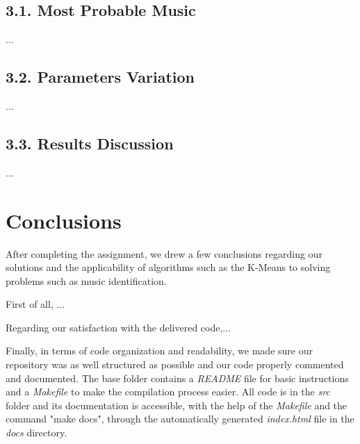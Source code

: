 \documentclass[12pt]{article}
\begin{document}
\subsection*{3.1. Most Probable Music}

...

\subsection*{3.2. Parameters Variation}

...

\subsection*{3.3. Results Discussion}

...

\newpage
\section*{Conclusions}

After completing the assignment, we drew a few conclusions regarding our 
solutions and the applicability of algorithms such as the K-Means to solving
problems such as music identification.

First of all, ...

Regarding our satisfaction with the delivered code,...

Finally, in terms of code organization and readability, we made sure our 
repository was as well structured as possible and our code properly commented
and documented.
The base folder contains a {\it README\/} file for basic instructions and a 
{\it Makefile\/} to make the compilation process easier.
All code is in the {\it src\/} folder and its documentation is accessible, 
with the help of the {\it Makefile\/} and the command "make docs", through
the automatically generated {\it index.html\/} file in the {\it docs\/} 
directory.
\end{document}
